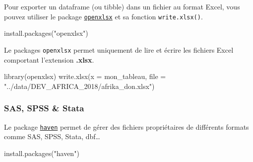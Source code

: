 \documentclass[
  letterpaper,
  DIV=11,
  numbers=noendperiod]{scrartcl}
\newenvironment{Shaded}{\begin{snugshade}}{\end{snugshade}}
\newcommand{\AttributeTok}[1]{\textcolor[rgb]{0.40,0.45,0.13}{#1}}
\newcommand{\FunctionTok}[1]{\textcolor[rgb]{0.28,0.35,0.67}{#1}}
\newcommand{\NormalTok}[1]{\textcolor[rgb]{0.00,0.23,0.31}{#1}}
\newcommand{\StringTok}[1]{\textcolor[rgb]{0.13,0.47,0.30}{#1}}
\begin{document}
Pour exporter un dataframe (ou tibble) dans un fichier au format Excel,
vous pouvez utiliser le package
\href{https://cran.r-project.org/web/packages/openxlsx/index.html}{\texttt{openxlsx}}
et sa fonction \texttt{write.xlsx()}.

\begin{Shaded}
\begin{Highlighting}[]
\FunctionTok{install.packages}\NormalTok{(}\StringTok{"openxlsx"}\NormalTok{)}
\end{Highlighting}
\end{Shaded}

\begin{tcolorbox}[enhanced jigsaw, opacityback=0, bottomrule=.15mm, titlerule=0mm, left=2mm, bottomtitle=1mm, title=\textcolor{quarto-callout-important-color}{\faExclamation}\hspace{0.5em}{Important}, opacitybacktitle=0.6, breakable, colbacktitle=quarto-callout-important-color!10!white, leftrule=.75mm, colframe=quarto-callout-important-color-frame, rightrule=.15mm, toprule=.15mm, coltitle=black, arc=.35mm, colback=white, toptitle=1mm]

Le packages \texttt{openxlsx} permet uniquement de lire et écrire les
fichiers Excel comportant l'extension \textbf{.xlsx}.

\end{tcolorbox}

\begin{Shaded}
\begin{Highlighting}[]
\FunctionTok{library}\NormalTok{(openxlsx)}
\FunctionTok{write.xlsx}\NormalTok{(}\AttributeTok{x =}\NormalTok{ mon\_tableau, }\AttributeTok{file =} \StringTok{"../data/DEV\_AFRICA\_2018/afrika\_don.xlsx"}\NormalTok{)}
\end{Highlighting}
\end{Shaded}

\hfill\break

\hypertarget{sas-spss-stata}{%
\subsubsection{SAS, SPSS \& Stata}\label{sas-spss-stata}}

Le package \href{https://haven.tidyverse.org/}{\texttt{haven}} permet de
gérer des fichiers propriétaires de différents formats comme SAS, SPSS,
Stata, dbf\ldots{}

\begin{Shaded}
\begin{Highlighting}[]
\FunctionTok{install.packages}\NormalTok{(}\StringTok{"haven"}\NormalTok{)}
\end{Highlighting}
\end{Shaded}
\end{document}
